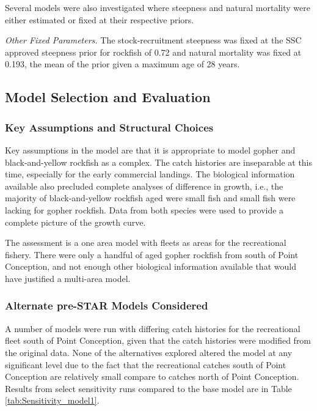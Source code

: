 \documentclass[12pt,]{article}
\begin{document}
Several models were also investigated where steepness and natural
mortality were either estimated or fixed at their respective priors.

\emph{Other Fixed Parameters.} The stock-recruitment steepness was fixed
at the SSC approved steepness prior for rockfish of 0.72 and natural
mortality was fixed at 0.193, the mean of the prior given a maximum age
of 28 years.

\subsection{Model Selection and
Evaluation}\label{model-selection-and-evaluation}

\subsubsection{Key Assumptions and Structural
Choices}\label{key-assumptions-and-structural-choices}

Key assumptions in the model are that it is appropriate to model gopher
and black-and-yellow rockfish as a complex. The catch histories are
inseparable at this time, especially for the early commercial landings.
The biological information available also precluded complete analyses of
difference in growth, i.e., the majority of black-and-yellow rockfish
aged were small fish and small fish were lacking for gopher rockfish.
Data from both species were used to provide a complete picture of the
growth curve.

The assessment is a one area model with fleets as areas for the
recreational fishery. There were only a handful of aged gopher rockfish
from south of Point Conception, and not enough other biological
information available that would have justified a multi-area model.

\subsubsection{Alternate pre-STAR Models
Considered}\label{alternate-pre-star-models-considered}

A number of models were run with differing catch histories for the
recreational fleet south of Point Conception, given that the catch
histories were modified from the original data. None of the alternatives
explored altered the model at any significant level due to the fact that
the recreational catches south of Point Conception are relatively small
compare to catches north of Point Conception. Results from select
sensitivity runs compared to the base model are in Table
\ref{tab:Sensitivity_model1}.
\end{document}
